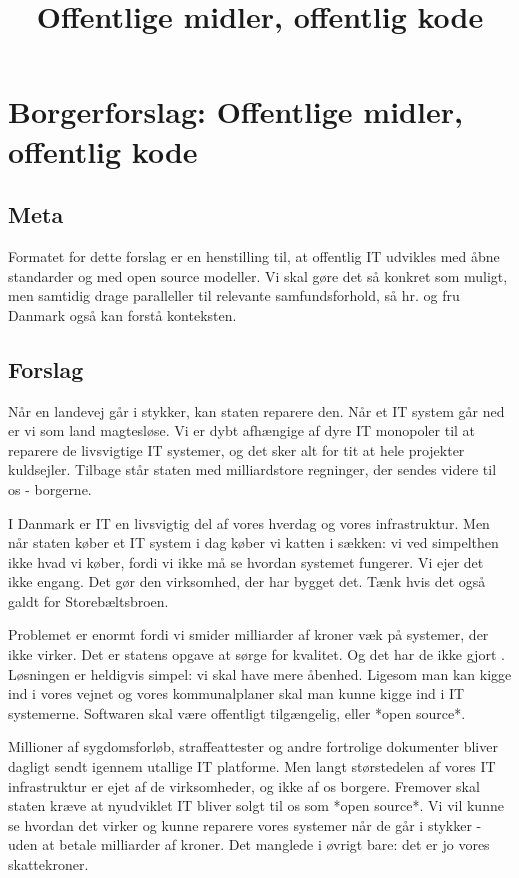 \documentclass[fleqn]{article}
\title{Offentlige midler, offentlig kode}
\author{}
\begin{document}
\maketitle

\setcounter{secnumdepth}{0}

\section{Borgerforslag: Offentlige midler, offentlig kode}

\subsection{Meta}
Formatet for dette forslag er en henstilling til, at offentlig IT udvikles med åbne
standarder og med open source modeller. Vi skal gøre det så konkret som muligt, men 
samtidig drage paralleller til relevante samfundsforhold, så hr. og fru Danmark også 
kan forstå konteksten.

\subsection{Forslag}
Når en landevej går i stykker, kan staten reparere den. Når et IT system går ned er
vi som land magtesløse. Vi er dybt afhængige af dyre IT monopoler til at reparere de
livsvigtige IT systemer, og det sker alt for tit at hele projekter kuldsejler.
Tilbage står staten med milliardstore regninger, der sendes videre til os - borgerne.

I Danmark er IT en livsvigtig del af vores hverdag og vores infrastruktur. Men når
staten køber et IT system i dag køber vi katten i sækken: vi ved simpelthen ikke
hvad vi køber, fordi vi ikke må se hvordan systemet fungerer. Vi ejer det ikke engang.
Det gør den virksomhed, der har bygget det. Tænk hvis det også galdt for Storebæltsbroen.

Problemet er enormt fordi vi smider milliarder af kroner væk på systemer, der ikke virker.
Det er statens opgave at sørge for kvalitet. Og det har de ikke gjort \cite{Lauesen}.
Løsningen er heldigvis simpel: vi skal have mere åbenhed.
Ligesom man kan kigge ind i vores vejnet og vores kommunalplaner skal man kunne
kigge ind i IT systemerne. Softwaren skal være offentligt tilgængelig, eller
*open source*.

Millioner af sygdomsforløb, straffeattester og andre fortrolige
dokumenter bliver dagligt sendt igennem utallige IT platforme. Men langt størstedelen
af vores IT infrastruktur er ejet af de virksomheder, og ikke af os borgere.
Fremover skal staten kræve at nyudviklet IT bliver solgt til os som *open source*.
Vi vil kunne se hvordan det virker og kunne reparere vores systemer når de går i stykker
- uden at betale milliarder af kroner.
Det manglede i øvrigt bare: det er jo vores skattekroner.
\end{document}
